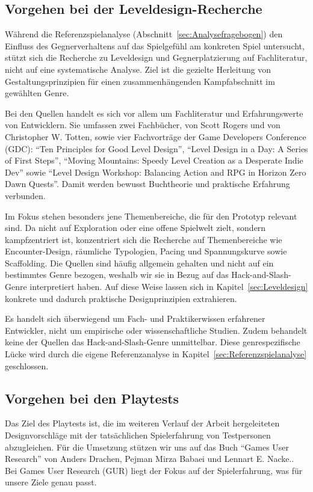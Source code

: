 \documentclass[../Main.tex]{subfiles}
\begin{document}
\subsection{Vorgehen bei der Leveldesign-Recherche}
Während die Referenzspielanalyse (Abschnitt~\ref{sec:Analysefragebogen}) den Einfluss des Gegnerverhaltens auf das Spielgefühl am konkreten Spiel untersucht, stützt sich die Recherche zu Leveldesign und Gegnerplatzierung auf Fachliteratur, nicht auf eine systematische Analyse. Ziel ist die gezielte Herleitung von Gestaltungsprinzipien für einen zusammenhängenden Kampfabschnitt im gewählten Genre.

Bei den Quellen handelt es sich vor allem um Fachliteratur und Erfahrungswerte von Entwicklern. Sie umfassen zwei Fachbücher,  von Scott Rogers\autocite{rogers2014levelup} und  von Christopher W. Totten\autocite{totten2014architectural}, sowie vier Fachvorträge der Game Developers Conference (GDC): \enquote{Ten Principles for Good Level Design}\autocite{gdc_tenprinciples2010}, \enquote{Level Design in a Day: A Series of First Steps}\autocite{gdc_leveldesignaday2020}, \enquote{Moving Mountains: Speedy Level Creation as a Desperate Indie Dev}\autocite{gdc_movingmountains2020} sowie \enquote{Level Design Workshop: Balancing Action and RPG in Horizon Zero Dawn Quests}\autocite{gdc_horizonquests2018}. Damit werden bewusst Buchtheorie und praktische Erfahrung verbunden.

Im Fokus stehen besonders jene Themenbereiche, die für den Prototyp relevant sind. Da  nicht auf Exploration oder eine offene Spielwelt zielt, sondern kampfzentriert ist, konzentriert sich die Recherche auf Themenbereiche wie Encounter-Design, räumliche Typologien, Pacing und Spannungskurve sowie Scaffolding. Die Quellen sind häufig allgemein gehalten und nicht auf ein bestimmtes Genre bezogen, weshalb wir sie in Bezug auf das Hack-and-Slash-Genre interpretiert haben. Auf diese Weise lassen sich in Kapitel~\ref{sec:Leveldesign} konkrete und dadurch praktische Designprinzipien extrahieren.

Es handelt sich überwiegend um Fach- und Praktikerwissen erfahrener Entwickler, nicht um empirische oder wissenschaftliche Studien. Zudem behandelt keine der Quellen das Hack-and-Slash-Genre unmittelbar. Diese genrespezifische Lücke wird durch die eigene Referenzanalyse in Kapitel~\ref{sec:Referenzspielanalyse} geschlossen.

\subsection{Vorgehen bei den Playtests}
Das Ziel des Playtests ist, die im weiteren Verlauf der Arbeit hergeleiteten Designvorschläge mit der tatsächlichen Spielerfahrung von Testpersonen abzugleichen. Für die Umsetzung stützen wir uns auf das Buch \enquote{Games User Research} von Anders Drachen, Pejman Mirza Babaei und Lennart E. Nacke.\autocite{drachen2018gamesuserresearch}. Bei Games User Research (GUR) liegt der Fokus auf der Spielerfahrung, was für unsere Ziele genau passt.
\end{document}
